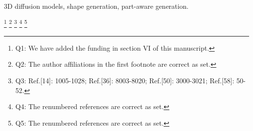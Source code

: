 \documentclass[lettersize,journal]{IEEEtran}
\begin{document}
\begin{IEEEkeywords}
3D diffusion models, shape generation, part-aware generation.
\end{IEEEkeywords}


\footnote{Q1: We have added the funding in section VI of this manuscript.}
\footnote{Q2: The author affiliations in the first footnote are correct as set.}
\footnote{Q3: Ref.[14]: 1005-1028; Ref.[36]: 8003-8020; Ref.[50]: 3000-3021; Ref.[58]: 50-52.}
\footnote{Q4: The renumbered references are correct as set.}
\footnote{Q5: The renumbered references are correct as set.}







% 
	


% 







\end{document}
